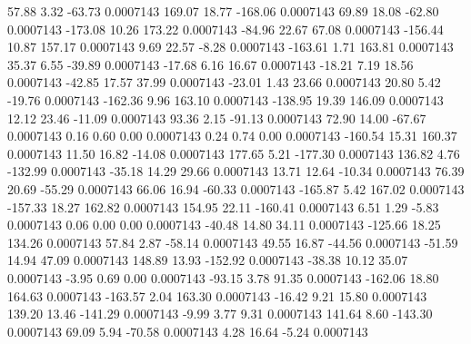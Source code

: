        57.88        3.32      -63.73     0.0007143
      169.07       18.77     -168.06     0.0007143
       69.89       18.08      -62.80     0.0007143
     -173.08       10.26      173.22     0.0007143
      -84.96       22.67       67.08     0.0007143
     -156.44       10.87      157.17     0.0007143
        9.69       22.57       -8.28     0.0007143
     -163.61        1.71      163.81     0.0007143
       35.37        6.55      -39.89     0.0007143
      -17.68        6.16       16.67     0.0007143
      -18.21        7.19       18.56     0.0007143
      -42.85       17.57       37.99     0.0007143
      -23.01        1.43       23.66     0.0007143
       20.80        5.42      -19.76     0.0007143
     -162.36        9.96      163.10     0.0007143
     -138.95       19.39      146.09     0.0007143
       12.12       23.46      -11.09     0.0007143
       93.36        2.15      -91.13     0.0007143
       72.90       14.00      -67.67     0.0007143
        0.16        0.60        0.00     0.0007143
        0.24        0.74        0.00     0.0007143
     -160.54       15.31      160.37     0.0007143
       11.50       16.82      -14.08     0.0007143
      177.65        5.21     -177.30     0.0007143
      136.82        4.76     -132.99     0.0007143
      -35.18       14.29       29.66     0.0007143
       13.71       12.64      -10.34     0.0007143
       76.39       20.69      -55.29     0.0007143
       66.06       16.94      -60.33     0.0007143
     -165.87        5.42      167.02     0.0007143
     -157.33       18.27      162.82     0.0007143
      154.95       22.11     -160.41     0.0007143
        6.51        1.29       -5.83     0.0007143
        0.06        0.00        0.00     0.0007143
      -40.48       14.80       34.11     0.0007143
     -125.66       18.25      134.26     0.0007143
       57.84        2.87      -58.14     0.0007143
       49.55       16.87      -44.56     0.0007143
      -51.59       14.94       47.09     0.0007143
      148.89       13.93     -152.92     0.0007143
      -38.38       10.12       35.07     0.0007143
       -3.95        0.69        0.00     0.0007143
      -93.15        3.78       91.35     0.0007143
     -162.06       18.80      164.63     0.0007143
     -163.57        2.04      163.30     0.0007143
      -16.42        9.21       15.80     0.0007143
      139.20       13.46     -141.29     0.0007143
       -9.99        3.77        9.31     0.0007143
      141.64        8.60     -143.30     0.0007143
       69.09        5.94      -70.58     0.0007143
        4.28       16.64       -5.24     0.0007143
